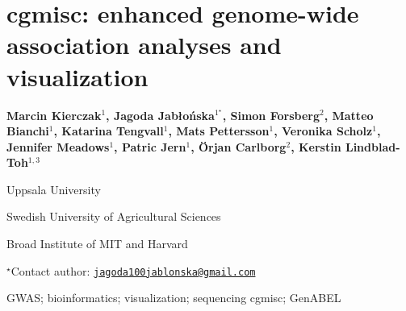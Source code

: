 \documentclass[\main/boa.tex]{subfiles}
\begin{document}
\section{cgmisc: enhanced genome-wide association analyses and visualization}

\begin{center}
  {\bf {} Marcin Kierczak$^{1}$,  Jagoda Jabłońska$^{1^\star}$,  Simon Forsberg$^{2}$,  Matteo Bianchi$^{1}$,  Katarina Tengvall$^{1}$,  Mats Pettersson$^{1}$,  Veronika Scholz$^{1}$,  Jennifer Meadows$^{1}$,  Patric Jern$^{1}$,  Örjan Carlborg$^{2}$,  Kerstin Lindblad-Toh$^{1,3}$}
\end{center}

\vskip 0.3cm

\begin{affiliations}
\begin{enumerate}
\begin{minipage}{0.915\textwidth}
\centering
\item Uppsala University \\[-2pt]
\item Swedish University of Agricultural Sciences \\[-2pt]
\item Broad Institute of MIT and Harvard \\[-2pt]
\end{minipage}
\end{enumerate}
$^\star$Contact author: \href{mailto:jagoda100jablonska@gmail.com}{\nolinkurl{jagoda100jablonska@gmail.com}}\\
\end{affiliations}

\vskip 0.5cm

\begin{minipage}{0.915\textwidth}
\keywords GWAS; bioinformatics; visualization; sequencing
\packages {} cgmisc;  GenABEL
\end{minipage}

\vskip 0.8cm
\end{document}
